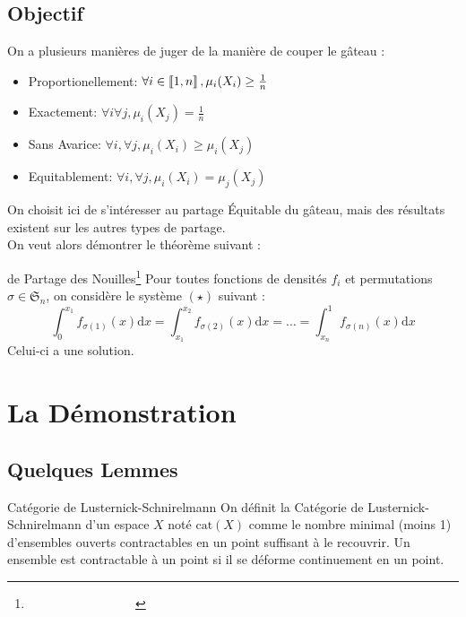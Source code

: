 \documentclass{cours}
\begin{document}
\subsection{Objectif}
On a plusieurs manières de juger de la manière de couper le gâteau\! :
\begin{itemize}
    \item Proportionellement: $\forall i \in \left\llbracket 1, n\right\rrbracket, \mu_{i}(X_{i}) \geq \frac{1}{n}$
    \item Exactement: $\forall i \forall j, \mu_{i}(X_{j}) = \frac{1}{n}$
    \item Sans Avarice: $\forall i, \forall j, \mu_{i}(X_{i}) \geq \mu_{i}(X_{j})$
    \item Equitablement: $\forall i, \forall j, \mu_{i}(X_{i}) = \mu_{j}(X_{j})$
\end{itemize}
On choisit ici de s'intéresser au partage Équitable du gâteau, mais des résultats existent sur les autres types de partage.\\
On veut alors démontrer le théorème suivant\! :

\begin{théorème}{de Partage des Nouilles\footnote{\textcolor{white}{Notation Étudiante}}}{}
Pour toutes fonctions de densités $f_{i}$ et permutations $\sigma \in \mathfrak{S}_{n}$, on considère le système $(\star)$ suivant\! :
\begin{equation*}\tag{$\star$}
    \int_{0}^{x_{1}}f_{\sigma(1)}(x) \mathrm{d}x = \int_{x_{1}}^{x_{2}}f_{\sigma(2)}(x)\mathrm{d}x = \ldots = \int_{x_{n}}^{1}f_{\sigma(n)}(x) \mathrm{d}x
\end{equation*}
Celui-ci a une solution.
\end{théorème}

\section{La Démonstration}
\subsection{Quelques Lemmes}
\begin{définition}{Catégorie de Lusternick-Schnirelmann}{}
On définit la Catégorie de Lusternick-Schnirelmann d'un espace $X$ noté $\text{cat}(X)$ comme le nombre minimal (moins 1) d'ensembles ouverts contractables en un point suffisant à le recouvrir. Un ensemble est contractable à un point si il se déforme continuement en un point.
\end{définition}
\end{document}
